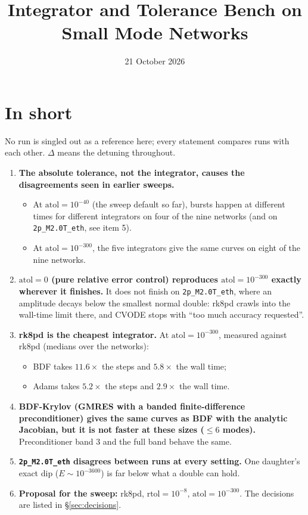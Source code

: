 \documentclass[10pt,a4paper]{article}
\title{Integrator and Tolerance Bench on Small Mode Networks}
\date{21 October 2026}
\newcommand{\atol}{\mathrm{atol}}
\newcommand{\rtol}{\mathrm{rtol}}
\begin{document}
\maketitle
\vspace{-1.5em}

\section*{In short}
No run is singled out as a reference here; every statement compares runs with each other. $\Delta$ means the detuning throughout.
\begin{enumerate}
    \item \textbf{The absolute tolerance, not the integrator, causes the disagreements seen in earlier sweeps.}
        \begin{itemize}
            \item At $\atol=10^{-40}$ (the sweep default so far), bursts happen at different times for different integrators on four of the nine networks (and on \texttt{2p\_M2.0T\_eth}, see item 5).
            \item At $\atol=10^{-300}$, the five integrators give the same curves on eight of the nine networks.
        \end{itemize}
    \item \textbf{$\atol=0$ (pure relative error control) reproduces $\atol=10^{-300}$ exactly wherever it finishes.} It does not finish on \texttt{2p\_M2.0T\_eth}, where an amplitude decays below the smallest normal double: rk8pd crawls into the wall-time limit there, and CVODE stops with ``too much accuracy requested''.
    \item \textbf{rk8pd is the cheapest integrator.} At $\atol=10^{-300}$, measured against rk8pd (medians over the networks):
        \begin{itemize}
            \item BDF takes $11.6\times$ the steps and $5.8\times$ the wall time;
            \item Adams takes $5.2\times$ the steps and $2.9\times$ the wall time.
        \end{itemize}
    \item \textbf{BDF-Krylov (GMRES with a banded finite-difference preconditioner) gives the same curves as BDF with the analytic Jacobian, but it is not faster at these sizes ($\le6$ modes).} Preconditioner band 3 and the full band behave the same.
    \item \textbf{\texttt{2p\_M2.0T\_eth} disagrees between runs at every setting.} One daughter's exact dip ($E\sim10^{-3600}$) is far below what a double can hold.
    \item \textbf{Proposal for the sweep:} rk8pd, $\rtol=10^{-8}$, $\atol=10^{-300}$. The decisions are listed in \S\ref{sec:decisions}.
\end{enumerate}
\end{document}
